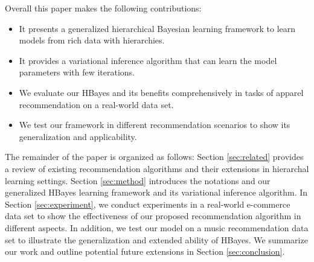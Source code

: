 Overall this paper makes the following contributions:

\begin{itemize}
\item It presents a generalized hierarchical Bayesian learning framework to learn models from rich data with hierarchies.
\item It provides a variational inference algorithm that can learn the model parameters with few iterations.
\item We evaluate our HBayes and its benefits comprehensively in tasks of apparel recommendation on a real-world data set. 
\item We test our framework in different recommendation scenarios to show its generalization and applicability.
\end{itemize}

The remainder of the paper is organized as follows: Section \ref{sec:related} provides a review of existing recommendation algorithms and their extensions in hierarchal learning settings. Section \ref{sec:method} introduces the notations and our generalized HBayes learning framework and its variational inference algorithm. In Section \ref{sec:experiment}, we conduct experiments in a real-world e-commerce data set to show the effectiveness of our proposed recommendation algorithm in different aspects. In addition, we test our model on a music recommendation data set to illustrate the generalization and extended ability of HBayes. We summarize our work and outline potential future extensions in Section \ref{sec:conclusion}.


